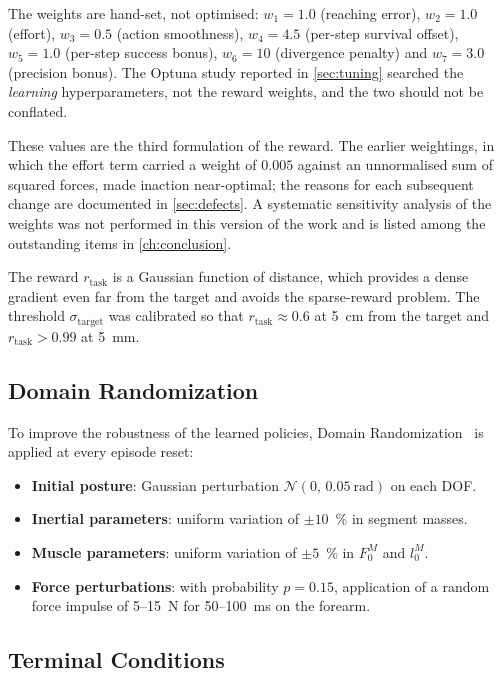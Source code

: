 The weights are hand-set, not optimised: $w_1 = 1.0$ (reaching error),
$w_2 = 1.0$ (effort), $w_3 = 0.5$ (action smoothness), $w_4 = 4.5$ (per-step
survival offset), $w_5 = 1.0$ (per-step success bonus), $w_6 = 10$ (divergence
penalty) and $w_7 = 3.0$ (precision bonus). The Optuna study reported in
\cref{sec:tuning} searched the \emph{learning} hyperparameters, not the reward
weights, and the two should not be conflated.

These values are the third formulation of the reward. The earlier weightings, in
which the effort term carried a weight of $0.005$ against an unnormalised sum of
squared forces, made inaction near-optimal; the reasons for each subsequent
change are documented in \cref{sec:defects}. A systematic sensitivity analysis of
the weights was not performed in this version of the work and is listed among the
outstanding items in \cref{ch:conclusion}.

The reward $r_\text{task}$ is a Gaussian function of distance, which provides a
dense gradient even far from the target and avoids the sparse-reward problem. The
threshold $\sigma_\text{target}$ was calibrated so that
$r_\text{task} \approx 0.6$ at \SI{5}{\centi\meter} from the target and
$r_\text{task} > 0.99$ at \SI{5}{\milli\meter}.

\subsection{Domain Randomization}
\label{sec:dr}

To improve the robustness of the learned policies, Domain
Randomization~\parencite{Tobin2017} is applied at every episode reset:

\begin{itemize}
  \item \textbf{Initial posture}: Gaussian perturbation
        $\mathcal{N}(0,\, 0.05~\text{rad})$ on each DOF.
  \item \textbf{Inertial parameters}: uniform variation of $\pm 10$~\% in segment
        masses.
  \item \textbf{Muscle parameters}: uniform variation of $\pm 5$~\% in
        $F_0^M$ and $l_0^M$.
  \item \textbf{Force perturbations}: with probability $p = 0.15$,
        application of a random force impulse of \num{5}--\SI{15}{\newton}
        for \num{50}--\SI{100}{\milli\second} on the forearm.
\end{itemize}

\subsection{Terminal Conditions}

